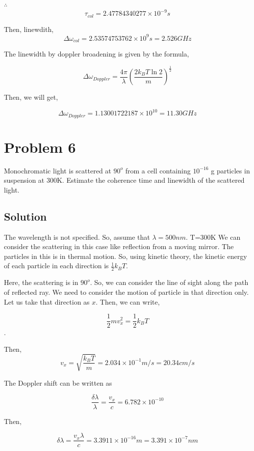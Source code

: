 \documentclass[a4paper,11pt]{article}
\begin{document}
\(\therefore\)
$$\tau_{col} = 2.47784340277\times10^{-9}s$$

Then, linewdith, $$\Delta\omega_{col} = 2.53574753762\times10^9 s= 2.526 GHz$$

The linewidth by doppler broadening is given by the formula,

\begin{equation}
\label{eq:orgc9ffa57}
\Delta\omega_{Doppler} = \frac{4\pi}{\lambda} \left(\frac{2 k_B T  \ln 2}{m}\right)^{\frac{1}{2}} 
\end{equation}

Then, we will get,

$$\Delta\omega_{Doppler} = 1.13001722187\times 10^{10} = 11.30 GHz$$

\newpage
\section*{Problem 6}
\label{sec:org8d461d1}
Monochromatic light is scattered at \(90^o\) from a cell containing \(10^{-16}\) g particles in suspension at 300K. Estimate the coherence time and linewidth of the scattered light.
\subsection*{Solution}
\label{sec:org4a98bc7}

The wavelength is not specified. So, assume that \(\lambda = 500nm\). T=300K
We can consider the scattering in this case like reflection from a moving mirror. The particles in this is in thermal motion. So, using kinetic theory, the kinetic energy of each particle in each direction is \(\frac{1}{2}k_BT\).

Here, the scattering is in \(90^o\). So, we can consider the line of sight along the path of reflected ray. We need to consider the motion of particle in that direction only. Let us take that direction as \(x\). Then, we can write,

$$\frac{1}{2} m v_x^2 = \frac{1}{2} k_B T$$.

Then, $$v_x = \sqrt{\frac{k_BT}{m}} = 2.034\times 10^{-1} m/s = 20.34cm/s$$

The Doppler shift can be written as

$$\frac{\delta\lambda}{\lambda} = \frac{v_x}{c} = 6.782\times10^{-10}$$

Then, 

$$\delta\lambda = \frac{v_x\lambda}{c} = 3.3911\times 10^{-16} m = 3.391\times 10^{-7}nm $$
\end{document}
